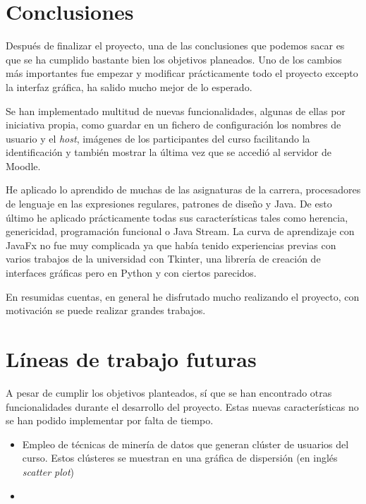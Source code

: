 
\section{Conclusiones}

Después de finalizar el proyecto, una de las conclusiones que podemos sacar es que se ha cumplido bastante bien los objetivos planeados. Uno de los cambios más importantes fue empezar y modificar prácticamente todo el proyecto excepto la interfaz gráfica, ha salido mucho mejor de lo esperado.  

Se han implementado multitud de nuevas funcionalidades, algunas de ellas por iniciativa propia, como guardar en un fichero de configuración los nombres de usuario y el \textit{host}, imágenes de los participantes del curso facilitando la identificación y también mostrar la última vez que se accedió al servidor de Moodle.

He aplicado lo aprendido de muchas de las asignaturas de la carrera, procesadores de lenguaje en las expresiones regulares, patrones de diseño y Java. De esto último he aplicado prácticamente todas sus características tales como herencia, genericidad, programación funcional o Java Stream. La curva de aprendizaje con JavaFx no fue muy complicada ya que había tenido experiencias previas con varios trabajos de la universidad con Tkinter\cite{noauthor_tkinter_nodate}, una librería de creación de interfaces gráficas pero en Python y con ciertos parecidos.



En resumidas cuentas, en general he disfrutado mucho realizando el proyecto, con motivación se puede realizar grandes trabajos.


\section{Líneas de trabajo futuras}

A pesar de cumplir los objetivos planteados, sí que se han encontrado otras funcionalidades durante el desarrollo del proyecto. Estas nuevas características no se han podido implementar por falta de tiempo.

\begin{itemize}
	\item Empleo de técnicas de minería de datos que generan clúster de usuarios del curso. Estos clústeres se muestran en una gráfica de dispersión (en inglés \textit{scatter plot})
	\item 
\end{itemize}
